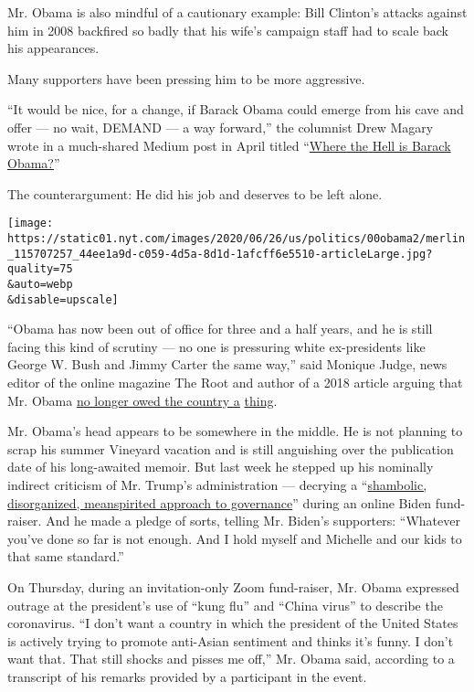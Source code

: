 Mr. Obama is also mindful of a cautionary example: Bill Clinton's
attacks against him in 2008 backfired so badly that his wife's campaign
staff had to scale back his appearances.

Many supporters have been pressing him to be more aggressive.

``It would be nice, for a change, if Barack Obama could emerge from his
cave and offer --- no wait, DEMAND --- a way forward,'' the columnist
Drew Magary wrote in a much-shared Medium post in April titled
``\href{https://gen.medium.com/where-the-hell-is-barack-obama-397ce8d7bbe2}{Where
the Hell is Barack Obama?}''

The counterargument: He did his job and deserves to be left alone.

\texttt{[image: https://static01.nyt.com/images/2020/06/26/us/politics/00obama2/merlin\_115707257\_44ee1a9d-c059-4d5a-8d1d-1afcff6e5510-articleLarge.jpg?quality=75\\\&auto=webp\\\&disable=upscale]}

``Obama has now been out of office for three and a half years, and he is
still facing this kind of scrutiny --- no one is pressuring white
ex-presidents like George W. Bush and Jimmy Carter the same way,'' said
Monique Judge, news editor of the online magazine The Root and author of
a 2018 article arguing that Mr. Obama
\href{https://www.theroot.com/obama-doesn-t-owe-this-country-shit-1826309455}{no
longer owed the country a}
\href{https://www.theroot.com/obama-doesn-t-owe-this-country-shit-1826309455}{thing}.

Mr. Obama's head appears to be somewhere in the middle. He is not
planning to scrap his summer Vineyard vacation and is still anguishing
over the publication date of his long-awaited memoir. But last week he
stepped up his nominally indirect criticism of Mr. Trump's
administration --- decrying a
``\href{https://www.nytimes.com/2020/06/23/us/politics/obama-biden-fundraiser.html}{shambolic,
disorganized, meanspirited approach to governance}'' during an online
Biden fund-raiser. And he made a pledge of sorts, telling Mr. Biden's
supporters: ``Whatever you've done so far is not enough. And I hold
myself and Michelle and our kids to that same standard.''

On Thursday, during an invitation-only Zoom fund-raiser, Mr. Obama
expressed outrage at the president's use of ``kung flu'' and ``China
virus'' to describe the coronavirus. ``I don't want a country in which
the president of the United States is actively trying to promote
anti-Asian sentiment and thinks it's funny. I don't want that. That
still shocks and pisses me off,'' Mr. Obama said, according to a
transcript of his remarks provided by a participant in the event.

